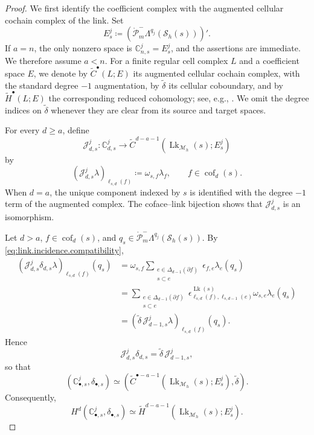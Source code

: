 \documentclass[a4paper,11pt]{article}
\theoremstyle{definition}
\newcommand{\Mh}{\mathcal{M}_h}
\newcommand{\Sh}{\mathcal{S}_h}
\newcommand{\FM}[1]{\Delta_{#1}}
\newcommand{\cof}[1]{\operatorname{cof}_{#1}}
\newcommand{\PLtrimz}[2]{\mathring{\mathcal P}_{#1}^{-}\Lambda^{#2}}
\begin{document}
\begin{proof}
We first identify the coefficient complex with the augmented cellular cochain complex of the link.
Set
\[
  E_s^j
  \coloneqq
  \left(\PLtrimz{m}{q_j}(\Sh(s))\right)'.
\]
If $a=n$, the only nonzero space is $\mathbb C_{n,s}^j=E_s^j$, and the assertions are immediate.
We therefore assume $a<n$.
For a finite regular cell complex $L$ and a coefficient space $E$, we denote by $\widetilde C^\bullet(L;E)$ its augmented cellular cochain complex, with the standard degree $-1$ augmentation, by $\widetilde\delta$ its cellular coboundary, and by $\widetilde H^\bullet(L;E)$ the corresponding reduced cohomology; see, e.g., \cite[Section~3.1, pp.~199 and~203]{Hatcher:02}.
We omit the degree indices on $\widetilde\delta$ whenever they are clear from its source and target spaces.

For every $d\geq a$, define
\[
  \mathcal J_{d,s}^j\colon
  \mathbb C_{d,s}^j
  \longrightarrow
  \widetilde C^{d-a-1}
  \left(
    \operatorname{Lk}_{\Mh}(s);
    E_s^j
  \right)
\]
by
\[
  \left(
    \mathcal J_{d,s}^j\lambda
  \right)_{\ell_{s,d}(f)}
  \coloneqq
  \omega_{s,f}\lambda_f,
  \qquad
  f\in\cof{d}(s).
\]
When $d=a$, the unique component indexed by $s$ is identified with the degree $-1$ term of the augmented complex.
The coface--link bijection shows that $\mathcal J_{d,s}^j$ is an isomorphism.

Let $d>a$, $f\in\cof{d}(s)$, and $q_s\in\PLtrimz{m}{q_j}(\Sh(s))$.
By \eqref{eq:link.incidence.compatibility},
\[
\begin{aligned}
\left(
  \mathcal J_{d,s}^j\delta_{d,s}\lambda
\right)_{\ell_{s,d}(f)}(q_s)
&=
\omega_{s,f}
\sum_{\substack{
  e\in\FM{d-1}(\partial f)\\
  s\subset e
}}
\epsilon_{f,e}\lambda_e(q_s)
\\
&=
\sum_{\substack{
  e\in\FM{d-1}(\partial f)\\
  s\subset e
}}
\epsilon^{\operatorname{Lk}(s)}_
{\ell_{s,d}(f),\ell_{s,d-1}(e)}
\omega_{s,e}\lambda_e(q_s)
\\
&=
\left(
  \widetilde\delta\,
  \mathcal J_{d-1,s}^j\lambda
\right)_{\ell_{s,d}(f)}(q_s).
\end{aligned}
\]
Hence
\begin{equation}\label{eq:coface.link.commuting}
  \mathcal J_{d,s}^j\delta_{d,s}
  =
  \widetilde\delta\,
  \mathcal J_{d-1,s}^j,
\end{equation}
so that
\[
  \left(
    \mathbb C_{\bullet,s}^j,
    \delta_{\bullet,s}
  \right)
  \simeq
  \left(
    \widetilde C^{\bullet-a-1}
    \left(
      \operatorname{Lk}_{\Mh}(s);
      E_s^j
    \right),
    \widetilde\delta
  \right).
\]
Consequently,
\[
  H^d
  \left(
    \mathbb C_{\bullet,s}^j,
    \delta_{\bullet,s}
  \right)
  \simeq
  \widetilde H^{d-a-1}
  \left(
    \operatorname{Lk}_{\Mh}(s);
    E_s^j
  \right).
\]


\end{proof}
\end{document}
